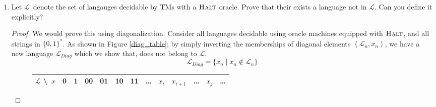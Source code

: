 \documentclass[usletter]{article}
\newcommand {\langset}[1]      {\ensuremath{\mathcal{#1}}}
\newcommand {\namedlangset}[1] {\ensuremath{\textnormal{\textsc{#1}}}}
\newcommand {\langL}          {\langset{L}}
\begin{document}
\begin{enumerate}[labelsep=2.5em, label=\textbf{\arabic{enumi}}]
  \item Let \langL\ denote the set of langauges decidable by TMs with a
        \namedlangset{Halt} oracle.
        Prove that their exists a language not in \langL.
        Can you define it explicitly?
  \begin{proof}
    We would prove this using diagonalization. Consider all languages decidable
    using oracle machines equipped with \namedlangset{Halt}, and all strings in
    $\{0,1\}^*$. As shown in Figure \ref{diag_table}; by simply inverting the
    memberships of diagonal elements $\left< \langL_n,x_n \right>$, we have a
    new language $\langL_{Diag}$ which we show that, does not belong to \langL.
    \begin{equation}
      \label{L_Diag}
      \langL_{Diag} = \{ x_n \mid x_n \not\in \langL_n \}
    \end{equation}

    \begin{figure}[h]
    \centering
    \def\arraystretch{1.8}\tabcolsep=6pt
    \begin{tabular}{|c||c|c|c|c|c|c|c|c|c|c|c|c|}
      \hline
      \textbf{\langL} \textbackslash~$x$
        & 0 & 1 & 00 & 01 & 10 & 11 & \ldots & $x_i$ & $x_{i+1}$ & \ldots
        & $x_j$ & \ldots \\\hline\hline


\end{tabular}
\end{figure}
\end{proof}
\end{enumerate}
\end{document}
